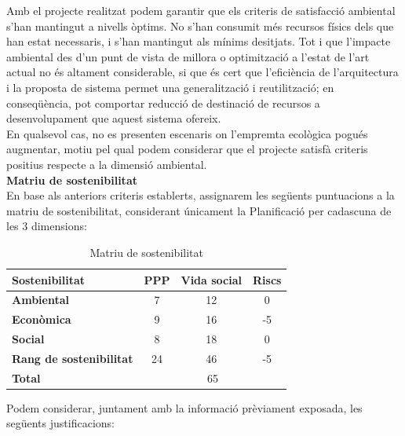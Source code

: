 Amb el projecte realitzat podem garantir que els criteris de satisfacció ambiental s'han mantingut a nivells òptims. No s'han consumit més recursos físics dels que han estat necessaris, i s'han mantingut als mínims desitjats. Tot i que l'impacte ambiental des d'un punt de vista de millora o optimització a l'estat de l'art actual no és altament considerable, si que és cert que l'eficiència de l'arquitectura i la proposta de sistema permet una generalització i reutilització; en conseqüència, pot comportar reducció de destinació de recursos a desenvolupament que aquest sistema ofereix.\\ 

En qualsevol cas, no es presenten escenaris on l'empremta ecològica pogués augmentar, motiu pel qual podem considerar que el projecte satisfà criteris positius respecte a la dimensió ambiental.\\

\noindent \textbf{\large Matriu de sostenibilitat}\\

\noindent En base als anteriors criteris establerts, assignarem les següents puntuacions a la matriu de sostenibilitat, considerant únicament la Planificació per cadascuna de les 3 dimensions:

\begin{table}[htb]
\centering
\label{MatriuSostenibilitat}
\begin{tabular}{lccc}
\hline \textbf{Sostenibilitat}                           &  \textbf{PPP} & \textbf{Vida social}                           &  \textbf{Riscs} \\
\hline
\textbf{Ambiental} & 7 & 12 & 0 \\
\hline            
\textbf{Econòmica} & 9 & 16 & -5 \\
\hline
\textbf{Social} & 8 & 18 & 0 \\
\hline
\textbf{Rang de sostenibilitat} & 24 & 46 & -5 \\
\hline
\textbf{Total} & \multicolumn{3}{c}{65}
\end{tabular}%
\caption{Matriu de sostenibilitat}
\end{table}

Podem considerar, juntament amb la informació prèviament exposada, les següents justificacions:


